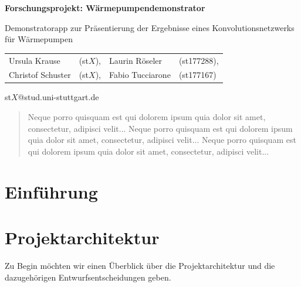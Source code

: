 \documentclass[a4paper]{extarticle}
\begin{document}
    \begin{center}
        \huge
        \textbf{Forschungsprojekt: Wärmepumpendemonstrator}
            
        \vspace{0.4cm}
        \large
        Demonstratorapp zur Präsentierung der Ergebnisse eines Konvolutionsnetzwerks für Wärmepumpen
            
        \vspace{0.6cm}
        \normalsize
        \begin{tabular}{llll}
            Ursula Krause & (st$X$), & Laurin Röseler & (st177288),\\
            Christof Schuster & (st$X$), & Fabio Tucciarone & (st177167)
        \end{tabular}

        \vspace{0.3cm}
        st$X$@stud.uni-stuttgart.de
        
        \vspace{0.8cm}
    \end{center}

    \begin{abstract}
        Neque porro quisquam est qui dolorem ipsum quia dolor sit amet, consectetur, adipisci velit...
        Neque porro quisquam est qui dolorem ipsum quia dolor sit amet, consectetur, adipisci velit...
        Neque porro quisquam est qui dolorem ipsum quia dolor sit amet, consectetur, adipisci velit...
    \end{abstract}

    \section{Einführung}

    


    \section{Projektarchitektur}

    Zu Begin möchten wir einen Überblick über die Projektarchitektur und die dazugehörigen Entwurfsentscheidungen geben.
    
\end{document}

